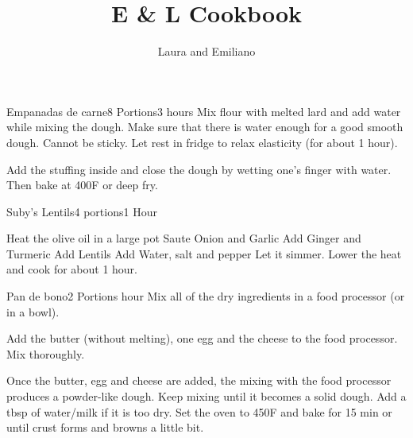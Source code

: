 \documentclass{article}
\title{\bfseries E \& L Cookbook}
\author{Laura and Emiliano}
\begin{document}
\maketitle

\begin{recipe}{Empanadas de carne}{8 Portions}{3 hours}
  Mix flour with melted lard and add water while mixing the dough. Make sure that
  there is water enough for a good smooth dough. Cannot be sticky. Let rest in
  fridge to relax elasticity (for about 1 hour).

\freeform
  Add the stuffing inside and close the dough by wetting one's finger with
  water. Then bake at 400F or deep fry.

%
\end{recipe}

\begin{recipe}{Suby's Lentils}{4 portions}{1 Hour}
    
Heat the olive oil in a large pot
Saute Onion and Garlic
Add Ginger and Turmeric
Add Lentils
Add Water, salt and pepper
Let it simmer. Lower the heat and cook for about 1 hour.

\end{recipe}

\begin{recipe}{Pan de bono}{2 Portions}{ hour}
  Mix all of the dry ingredients in a food processor (or in a bowl).

  Add the butter (without melting), one egg and the cheese to the food
  processor. Mix thoroughly.

  \freeform
  Once the butter, egg and cheese are added, the mixing with the food processor
  produces a powder-like dough. Keep mixing until it becomes a solid dough. Add
  a tbsp of water/milk if it is too dry.
 Set the oven to 450\degree{}F and bake for 15 min or until crust forms and
 browns a little bit.%
\end{recipe}
\end{document}
